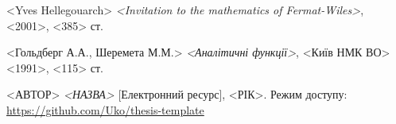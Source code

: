 \documentclass[12pt,a4paper]{article}
\begin{document}
\clearpage
{}
\begin{thebibliography}{9}

  <Yves Hellegouarch> \emph{<Invitation to the mathematics of Fermat-Wiles>},
    <2001>, <385> ст.
    
  <Гольдберг А.А., Шеремета М.М.> \emph{<Аналітичні функції>},
    <Київ НМК ВО> <1991>, <115> ст.
      
  <АВТОР> \emph{<НАЗВА>} [Електронний ресурс],
    <РІК>. Режим доступу:
    \url{https://github.com/Uko/thesis-template}

\end{thebibliography}
\end{document}
